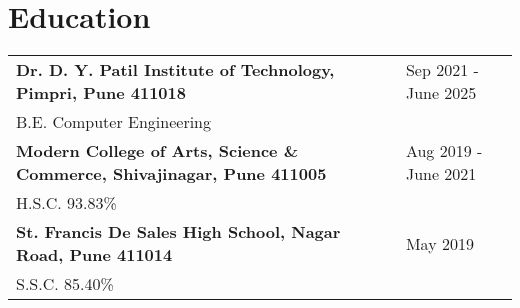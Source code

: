 \documentclass[a4paper,10pt]{article}
\makeatletter
\newenvironment{jobshort}[2]
    {
    \begin{tabularx}{\linewidth}{@{}l X r@{}}
    \textbf{#1} & \hfill &  #2 \\[3.75pt]
    \end{tabularx}
    }
    {
    }
\newenvironment{joblong}[2]
    {
    \begin{tabularx}{\linewidth}{@{}l X r@{}}
    \textbf{#1} & \hfill &  #2 \\[3.75pt]
    \end{tabularx}
    \begin{minipage}[t]{\linewidth}
    \begin{itemize}[nosep,after=\strut, leftmargin=1em, itemsep=3pt,label=--]
    }
    {
    \end{itemize}
    \end{minipage}    
    }
\makeatother
\begin{document}
\section{Education}
\begin{tabularx}{\linewidth}{@{}l X@{}}	

\textbf{Dr. D. Y. Patil Institute of Technology, Pimpri, Pune 411018} & \hfill 
Sep 2021 - June 2025 \\ \vspace*{2mm}
B.E. Computer Engineering \\ 

\textbf{Modern College of Arts, Science \& Commerce, Shivajinagar, Pune 411005} & \hfill 
Aug 2019 - June 2021 \\ \vspace*{2mm}
H.S.C. 93.83\% \\ 

\textbf{St. Francis De Sales High School, Nagar Road, Pune 411014} & \hfill 
May 2019 \\ 
S.S.C. 85.40\% \\

\end{tabularx}




  
\end{document}
